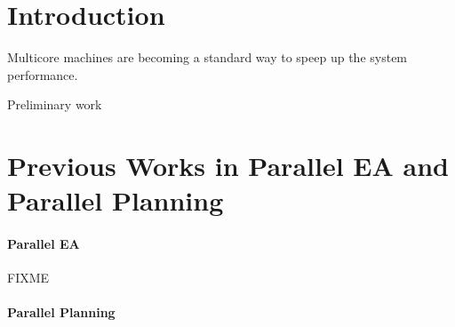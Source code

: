 \documentclass{sig-alternate}
\begin{document}
\section{Introduction}
Multicore machines are becoming a standard way to speep up the system performance.


Preliminary work


\section{Previous Works in Parallel EA and Parallel Planning}

\paragraph{Parallel EA}

FIXME

\paragraph{Parallel Planning} %
\label{section:previous-work}
\end{document}
